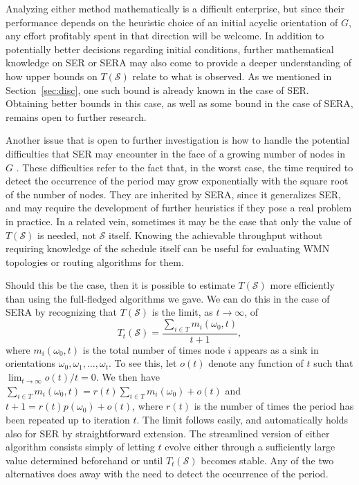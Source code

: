 \documentclass{article}
\begin{document}
Analyzing either method mathematically is a difficult enterprise, but since
their performance depends on the heuristic choice of an initial acyclic
orientation of $G$, any effort profitably spent in that direction will be
welcome. In addition to potentially better decisions regarding initial
conditions, further mathematical knowledge on SER or SERA may also come to
provide a deeper understanding of how upper bounds on $T(\mathcal{S})$ relate to
what is observed. As we mentioned in Section~\ref{sec:disc}, one such bound is
already known in the case of SER. Obtaining better bounds in this case, as well
as some bound in the case of SERA, remains open to further research.

Another issue that is open to further investigation is how to handle the
potential difficulties that SER may encounter in the face of a growing number of
nodes in $G$ \cite{mr92,mmz93}. These difficulties refer to the fact that, in
the worst case, the time required to detect the occurrence of the period may
grow exponentially with the square root of the number of nodes. They are
inherited by SERA, since it generalizes SER, and may require the development of
further heuristics if they pose a real problem in practice. In a related vein,
sometimes it may be the case that only the value of $T(\mathcal{S})$ is needed,
not $\mathcal{S}$ itself. Knowing the achievable throughput without requiring
knowledge of the schedule itself can be useful for evaluating WMN topologies or
routing algorithms for them.

Should this be the case, then it is possible to estimate $T(\mathcal{S})$ more
efficiently than using the full-fledged algorithms we gave. We can do this in
the case of SERA by recognizing that $T(\mathcal{S})$ is the limit, as
$t\to\infty$, of
\begin{equation}
T_t(\mathcal{S})=
\frac{\sum_{i\in T}m_i(\omega_0,t)}{t+1},
\end{equation}
where $m_i(\omega_0,t)$ is the total number of times node $i$ appears as a sink
in orientations $\omega_0,\omega_1,\ldots,\omega_t$. To see this, let $o(t)$
denote any function of $t$ such that $\lim_{t\to\infty}o(t)/t=0$. We then have
$\sum_{i\in T}m_i(\omega_0,t)=r(t)\sum_{i\in T}m_i(\omega_0)+o(t)$ and
$t+1=r(t)p(\omega_0)+o(t)$, where $r(t)$ is the number of times the period has
been repeated up to iteration $t$. The limit follows easily, and automatically
holds also for SER by straightforward extension. The streamlined version of
either algorithm consists simply of letting $t$ evolve either through a
sufficiently large value determined beforehand or until $T_t(\mathcal{S})$
becomes stable. Any of the two alternatives does away with the need to detect
the occurrence of the period.
\end{document}
